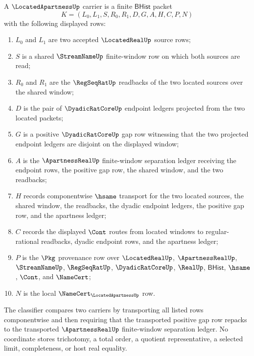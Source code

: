 \begin{definition}
\label{def:located-apartness-carrier}
A $\LocatedApartnessUp$ carrier is a finite $\mathsf{BHist}$ packet
$$
K=(L_0,L_1,S,R_0,R_1,D,G,A,H,C,P,N)
$$
with the following displayed rows:
\begin{enumerate}
\item $L_0$ and $L_1$ are two accepted $\LocatedRealUp$ source rows;
\item $S$ is a shared $\StreamNameUp$ finite-window row on which both sources
are read;
\item $R_0$ and $R_1$ are the $\RegSeqRatUp$ readbacks of the two located
sources over the shared window;
\item $D$ is the pair of $\DyadicRatCoreUp$ endpoint ledgers projected from
the two located packets;
\item $G$ is a positive $\DyadicRatCoreUp$ gap row witnessing that the two
projected endpoint ledgers are disjoint on the displayed window;
\item $A$ is the $\ApartnessRealUp$ finite-window separation ledger receiving
the endpoint rows, the positive gap row, the shared window, and the two
readbacks;
\item $H$ records componentwise $\hsame$ transport for the two located sources,
the shared window, the readbacks, the dyadic endpoint ledgers, the positive gap
row, and the apartness ledger;
\item $C$ records the displayed $\Cont$ routes from located windows to
regular-rational readbacks, dyadic endpoint rows, and the apartness ledger;
\item $P$ is the $\Pkg$ provenance row over $\LocatedRealUp$,
$\ApartnessRealUp$, $\StreamNameUp$, $\RegSeqRatUp$, $\DyadicRatCoreUp$,
$\RealUp$, $\mathsf{BHist}$, $\hsame$, $\Cont$, and $\NameCert$;
\item $N$ is the local $\NameCert_{\LocatedApartnessUp}$ row.
\end{enumerate}
The classifier compares two carriers by transporting all listed rows
componentwise and then requiring that the transported positive gap row repacks
to the transported $\ApartnessRealUp$ finite-window separation ledger. No
coordinate stores trichotomy, a total order, a quotient representative, a
selected limit, completeness, or host real equality.
\end{definition}

